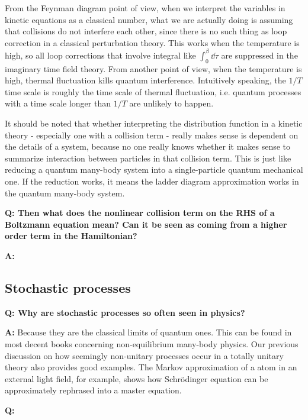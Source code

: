 \documentclass[hyperref, a4paper]{article}
\newenvironment{qanda}{\setlength{\parindent}{0pt}}{\bigskip}
\newcommand{\Q}{\bigskip\bfseries Q: }
\newcommand{\A}{\par\textbf{A:} \normalfont}
\begin{document}
\begin{qanda}
From the Feynman diagram point of view, when we interpret the variables in kinetic equations as a 
classical number, what we are actually doing is assuming that collisions do not interfere each other, 
since there is no such thing as loop correction in a classical perturbation theory. 
This works when the temperature is high, so all loop corrections that involve integral like $\int_0^\beta \dd{\tau}$
are suppressed in the imaginary time field theory. 
From another point of view, when the temperature is high, thermal fluctuation kills quantum interference. 
Intuitively speaking, the $1/T$ time scale is roughly the time scale of thermal fluctuation, 
i.e. quantum processes with a time scale longer than $1/T$ are unlikely to happen.

It should be noted that whether interpreting the distribution function in a kinetic theory - especially one with
a collision term - really makes sense is dependent on the details of a system, because no one really knows 
whether it makes sense to summarize interaction between particles in that collision term.
This is just like reducing a quantum many-body system into a single-particle quantum mechanical one.
If the reduction works, it means the ladder diagram approximation works in the quantum many-body system.

\Q Then what does the nonlinear collision term on the RHS of a Boltzmann equation mean? Can it be seen as coming 
from a higher order term in the Hamiltonian?
\A 

\end{qanda}

\subsection{Stochastic processes}

\begin{qanda}
    
\Q Why are stochastic processes so often seen in physics?
\A Because they are the classical limits of quantum ones. This can be found in most decent books concerning non-equilibrium many-body physics.
Our previous discussion on how seemingly non-unitary processes occur in a totally unitary theory also provides 
good examples. The Markov approximation of a atom in an external light field, for example, shows how Schrödinger 
equation can be approximately rephrased into a master equation. 

\Q 

\end{qanda}
\end{document}
